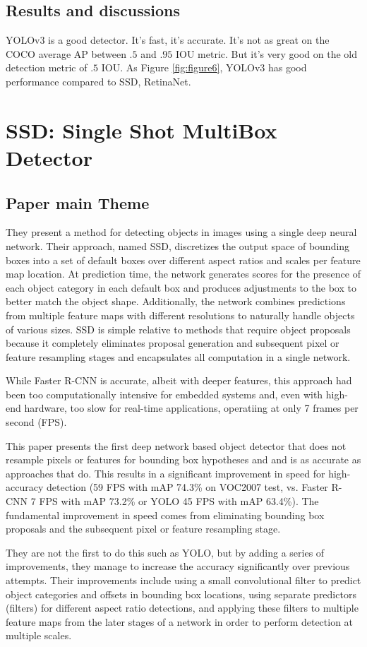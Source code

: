 \documentclass{ieeeaccess}
\begin{document}
\subsection{Results and discussions}
YOLOv3 is a good detector. It’s fast, it’s accurate. It’s not as great on the COCO average AP between $.5$ and $.95$ IOU metric. But it’s very good on the old detection metric of $.5$ IOU. As Figure \ref{fig:figure6}, YOLOv3 has good performance compared to SSD, RetinaNet.


\section{SSD: Single Shot MultiBox Detector}
\subsection{Paper main Theme}
They present a method for detecting objects in images using a single deep neural network. Their approach, named SSD, discretizes the output space of
bounding boxes into a set of default boxes over different aspect ratios and scales per feature map location. At prediction time, the network generates scores for the
presence of each object category in each default box and produces adjustments to the box to better match the object shape. Additionally, the network combines predictions from multiple feature maps with different resolutions to naturally handle objects of various sizes. SSD is simple relative to methods that require object
proposals because it completely eliminates proposal generation and subsequent pixel or feature resampling stages and encapsulates all computation in a single network.

While Faster R-CNN is accurate, albeit with deeper features, this approach had been too computationally intensive for embedded systems and, even with high-end hardware, too slow for real-time applications, operatiing at only 7 frames per second (FPS).

This paper presents the first deep network based object detector that does not resample pixels or features for bounding box hypotheses and and is as accurate as approaches that do. This results in a significant improvement in speed for high-accuracy detection (59 FPS with mAP 74.3\% on VOC2007 test, vs. Faster R-CNN 7 FPS with mAP 73.2\% or YOLO 45 FPS with mAP 63.4\%). The fundamental improvement in speed comes from eliminating bounding box proposals and the subsequent pixel or feature resampling stage.

They are not the first to do this such as YOLO, but by adding a series of improvements, they manage to increase the accuracy significantly over previous attempts. Their improvements include using a small convolutional filter to predict object categories and offsets in bounding box locations, using separate predictors (filters) for different aspect ratio detections, and applying these filters to multiple feature maps from the later stages of a network in order to perform detection at multiple scales.
\end{document}
